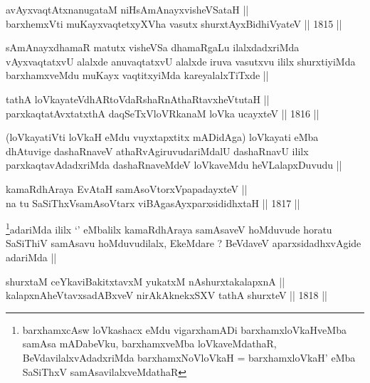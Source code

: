 

\begin{shl}
avAyxvaqtAtxnanugataM niHsAmAnayxvisheVSataH ||  \\
barxhemxVti muKayxvaqtetxyXVha vasutx shurxtAyx\s BidhiVyateV ||  1815 ||  
\end{shl}

\begin{artha}
sAmAnayxdhamaR matutx visheVSa dhamaRgaLu ilalxdadxriMda vAyxvaqtatxvU
alalxde anuvaqtatxvU alalxde iruva vasutxvu ililx shurxtiyiMda
barxhamxveMdu muKayx vaqtitxyiMda kareyalalxTiTxde || 
\end{artha}


\begin{shl}
tathA loVkayateVdhARtoVdaRshaRnAthaRtavxheVtutaH ||  \\
parxkaqtatAvxtatxthA daqSeTxVloVRkanaM loVka ucayxteV ||  1816 ||  
\end{shl}

\begin{artha}
(loVkayatiVti loVkaH eMdu vuyxtapxtitx mADidAga) loVkayati eMba
dhAtuvige dashaRnaveV athaRvAgiruvudariMdalU dashaRnavU ililx
parxkaqtavAdadxriMda dashaRnaveMdeV loVkaveMdu heVLalapxDuvudu ||
\end{artha}

\begin{shl}
kamaRdhAraya EvAtaH samAsoV\s torxVpapadayxteV || \\
na tu SaSiThxVsamAsoV\s tarx viBAgasAyxparxsididhxtaH ||  1817 ||  
\end{shl}

\begin{artha}
\footnote[1]{barxhamxcAsw loVkashacx eMdu vigarxhamADi
barxhamxloVkaHveMba samAsa mADabeVku, barxhamxveMba loVkaveMdathaR,
BeVdavilalxvAdadxriMda barxhamxNoVloVkaH = barxhamxloVkaH' eMba
SaSiThxV samAsavilalxveMdathaR}adariMda ililx `\stext' eMbalilx kamaRdhAraya samAsaveV
hoMduvude horatu SaSiThiV samAsavu hoMduvudilalx, EkeMdare ? BeVdaveV
aparxsidadhxvAgide adariMda ||
\end{artha}


\begin{shl}
shurxtaM ceYkaviBakitxtavxM yukatxM nAshurxtakalapxnA || \\
kalapxnAheVtavxsadABxveV nirAkAknekxSXV tathA shurxteV ||  1818 ||  
\end{shl}

